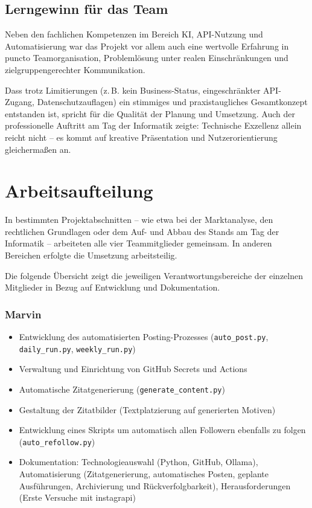 \documentclass[a4paper,12pt]{article}
\begin{document}
\subsection{Lerngewinn für das Team}

Neben den fachlichen Kompetenzen im Bereich KI, API-Nutzung und Automatisierung war das Projekt vor allem auch eine wertvolle Erfahrung in puncto Teamorganisation, Problemlösung unter realen Einschränkungen und zielgruppengerechter Kommunikation.

Dass trotz Limitierungen (z.\,B. kein Business-Status, eingeschränkter API-Zugang, Datenschutzauflagen) ein stimmiges und praxistaugliches Gesamtkonzept entstanden ist, spricht für die Qualität der Planung und Umsetzung. Auch der professionelle Auftritt am Tag der Informatik zeigte: Technische Exzellenz allein reicht nicht – es kommt auf kreative Präsentation und Nutzerorientierung gleichermaßen an.


\section{Arbeitsaufteilung}
In bestimmten Projektabschnitten – wie etwa bei der Marktanalyse, den rechtlichen Grundlagen oder dem Auf- und Abbau des Stands am Tag der Informatik – arbeiteten alle vier Teammitglieder gemeinsam. In anderen Bereichen erfolgte die Umsetzung arbeitsteilig.

Die folgende Übersicht zeigt die jeweiligen Verantwortungsbereiche der einzelnen Mitglieder in Bezug auf Entwicklung und Dokumentation.

\subsubsection*{Marvin}

\begin{itemize}
    \item Entwicklung des automatisierten Posting-Prozesses (\texttt{auto\_post.py}, \texttt{daily\_run.py}, \texttt{weekly\_run.py})
    \item Verwaltung und Einrichtung von GitHub Secrets und Actions
    \item Automatische Zitatgenerierung (\texttt{generate\_content.py})
    \item Gestaltung der Zitatbilder (Textplatzierung auf generierten Motiven)
    \item Entwicklung eines Skripts um automatisch allen Followern ebenfalls zu folgen (\texttt{auto\_refollow.py})
    \item Dokumentation: Technologieauswahl (Python, GitHub, Ollama), Automatisierung (Zitatgenerierung, automatisches Posten, geplante Ausführungen, Archivierung und Rückverfolgbarkeit), Herausforderungen (Erste Versuche mit instagrapi)
\end{itemize}
\end{document}
